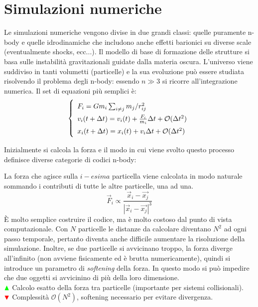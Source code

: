 \section{Simulazioni numeriche}
Le simulazioni numeriche vengono divise in due grandi classi: quelle puramente n-body e quelle idrodinamiche che includono anche effetti barionici su diverse scale (eventualmente shocks, ecc...). Il modello di base di formazione delle strutture si basa sulle instabilità gravitazionali guidate dalla materia oscura. L'universo viene suddiviso in tanti volumetti (particelle) e la sua evoluzione può essere studiata risolvendo il problema degli n-body: essendo $n\gg 3$ si ricorre all'integrazione numerica. 
Il set di equazioni più semplici è: 
\begin{equation}\left\{
    \def\arraystretch{1.5}
        \begin{array}{ll}
        F_i = Gm_i \sum_{i\neq j} m_j/r_{ij}^2 \\
        v_i(t+\Delta t)=v_i (t)+\frac{F_i}{m_i} \Delta t + \mathcal{O} (\Delta t^2) \\
        x_i(t+\Delta t)=x_i (t)+v_i \Delta t + \mathcal{O} (\Delta t^2)
    \end{array}\right. 
\end{equation}

Inizialmente si calcola la forza e il modo in cui viene svolto questo processo definisce diverse categorie di codici n-body:

\begin{example}
    La forza che agisce sulla $i-esima$ particella viene calcolata in modo naturale sommando i contributi di tutte le altre particelle, una ad una. $$ \vec{F}_i \propto \frac{\vec{x}_i-\vec{x_j}}{|\vec{x}_i-\vec{x_j}|^3}$$È molto semplice costruire il codice, ma è molto costoso dal punto di vista computazionale. Con $N$ particelle le distanze da calcolare diventano $N^2$ ad ogni passo temporale, pertanto diventa anche difficile aumentare la risoluzione della simulazione. Inoltre, se due particelle si avvicinano troppo, la forza diverge all'infinito (non avviene fisicamente ed è brutta numericamente), quindi si introduce un parametro di \textit{softening} della forza. In questo modo si può impedire che due oggetti si avvicinino di più della loro dimensione. 
    \\ ${\color{green} \blacktriangle  } $ Calcolo esatto della forza tra particelle (importante per sistemi collisionali). \\ ${\color{red} \blacktriangledown } $ Complessità $\mathcal{O} (N^2)$, softening necessario per evitare divergenza.
 
\end{example}   


